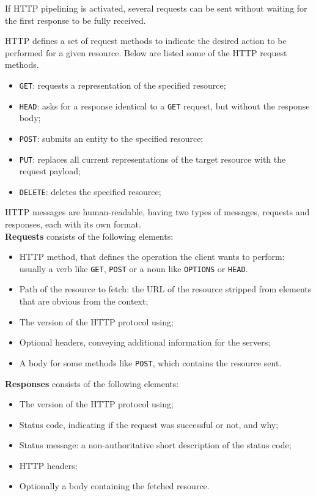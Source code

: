 If HTTP pipelining is activated, several requests can be sent without waiting for the first response to be fully received.


HTTP defines a set of request methods to indicate the desired action to be performed for a given resource. Below are listed some of the HTTP request methods. \cite{http_methods}

\begin{itemize}
	\item \verb|GET|: requests a representation of the specified resource;
	\item \verb|HEAD|: asks for a response identical to a \verb|GET| request, but without the response body;
	\item \verb|POST|: submits an entity to the specified resource;
	\item \verb|PUT|: replaces all current representations of the target resource with the request payload;
	\item \verb|DELETE|: deletes the specified resource;
\end{itemize}


HTTP messages are human-readable, having two types of messages, requests and responses, each with its own format.\\

\textbf{Requests} consists of the following elements:
\begin{itemize}
	\item HTTP method, that defines the operation the client wants to perform: usually a verb like \verb|GET|, \verb|POST| or a noun like \verb|OPTIONS| or \verb|HEAD|.
	\item Path of the resource to fetch: the URL of the resource stripped from elements that are obvious from the context;
	\item The version of the HTTP protocol using;
	\item Optional headers, conveying additional information for the servers;
	\item A body for some methods like \verb|POST|, which contains the resource sent.
\end{itemize}

\clearpage
\textbf{Responses} consists of the following elements:
\begin{itemize}
	\item The version of the HTTP protocol using;
	\item Status code, indicating if the request was successful or not, and why;
	\item Status message: a non-authoritative short description of the status code;
	\item HTTP headers;
	\item Optionally a body containing the fetched resource.
\end{itemize}

